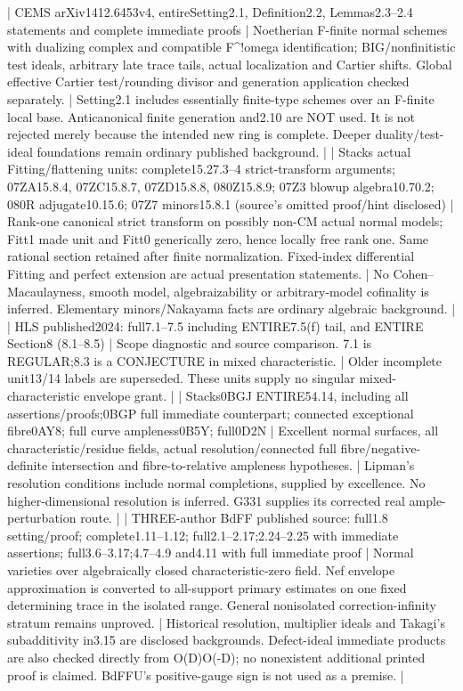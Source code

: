 \documentclass[11pt]{article}
\begin{document}
\begin{QualifiedData}
| CEMS arXiv1412.6453v4, entireSetting2.1, Definition2.2, Lemmas2.3--2.4 statements and complete immediate proofs | Noetherian F-finite normal schemes with dualizing complex and compatible F^!omega identification; BIG/nonfinitistic test ideals, arbitrary late trace tails, actual localization and Cartier shifts. Global effective Cartier test/rounding divisor and generation application checked separately. | Setting2.1 includes essentially finite-type schemes over an F-finite local base. Anticanonical finite generation and2.10 are NOT used. It is not rejected merely because the intended new ring is complete. Deeper duality/test-ideal foundations remain ordinary published background. |
| Stacks actual Fitting/flattening units: complete15.27.3--4 strict-transform arguments; 07ZA15.8.4, 07ZC15.8.7, 07ZD15.8.8, 080Z15.8.9; 07Z3 blowup algebra10.70.2; 080R adjugate10.15.6; 07Z7 minors15.8.1 (source's omitted proof/hint disclosed) | Rank-one canonical strict transform on possibly non-CM actual normal models; Fitt1 made unit and Fitt0 generically zero, hence locally free rank one. Same rational section retained after finite normalization. Fixed-index differential Fitting and perfect extension are actual presentation statements. | No Cohen--Macaulayness, smooth model, algebraizability or arbitrary-model cofinality is inferred. Elementary minors/Nakayama facts are ordinary algebraic background. |
| HLS published2024: full7.1--7.5 including ENTIRE7.5(f) tail, and ENTIRE Section8 (8.1--8.5) | Scope diagnostic and source comparison. 7.1 is REGULAR;8.3 is a CONJECTURE in mixed characteristic. | Older incomplete unit13/14 labels are superseded. These units supply no singular mixed-characteristic envelope grant. |
| Stacks0BGJ ENTIRE54.14, including all assertions/proofs;0BGP full immediate counterpart; connected exceptional fibre0AY8; full curve ampleness0B5Y; full0D2N | Excellent normal surfaces, all characteristic/residue fields, actual resolution/connected full fibre/negative-definite intersection and fibre-to-relative ampleness hypotheses. | Lipman's resolution conditions include normal completions, supplied by excellence. No higher-dimensional resolution is inferred. G331 supplies its corrected real ample-perturbation route. |
| THREE-author BdFF published source: full1.8 setting/proof; complete1.11--1.12; full2.1--2.17;2.24--2.25 with immediate assertions; full3.6--3.17;4.7--4.9 and4.11 with full immediate proof | Normal varieties over algebraically closed characteristic-zero field. Nef envelope approximation is converted to all-support primary estimates on one fixed determining trace in the isolated range. General nonisolated correction-infinity stratum remains unproved. | Historical resolution, multiplier ideals and Takagi's subadditivity in3.15 are disclosed backgrounds. Defect-ideal immediate products are also checked directly from O(D)O(-D); no nonexistent additional printed proof is claimed. BdFFU's positive-gauge sign is not used as a premise. |

\end{QualifiedData}
\end{document}
